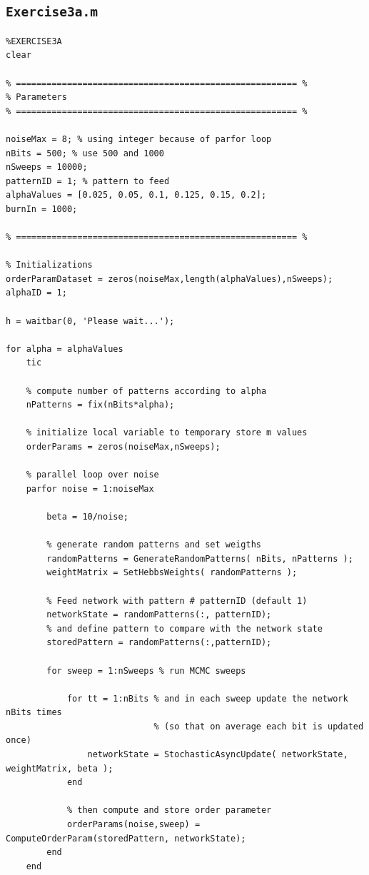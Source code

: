 \documentclass[12pt,A4,titlepage]{article}
\begin{document}
\subsection*{\texttt{Exercise3a.m}}
\begin{lstlisting}
%EXERCISE3A
clear 

% ======================================================= %
% Parameters
% ======================================================= %

noiseMax = 8; % using integer because of parfor loop
nBits = 500; % use 500 and 1000
nSweeps = 10000;
patternID = 1; % pattern to feed
alphaValues = [0.025, 0.05, 0.1, 0.125, 0.15, 0.2];
burnIn = 1000;

% ======================================================= %

% Initializations
orderParamDataset = zeros(noiseMax,length(alphaValues),nSweeps);
alphaID = 1;

h = waitbar(0, 'Please wait...');

for alpha = alphaValues
    tic

    % compute number of patterns according to alpha
    nPatterns = fix(nBits*alpha);

    % initialize local variable to temporary store m values
    orderParams = zeros(noiseMax,nSweeps);

    % parallel loop over noise
    parfor noise = 1:noiseMax

        beta = 10/noise;

        % generate random patterns and set weigths
        randomPatterns = GenerateRandomPatterns( nBits, nPatterns );
        weightMatrix = SetHebbsWeights( randomPatterns );

        % Feed network with pattern # patternID (default 1)
        networkState = randomPatterns(:, patternID);
        % and define pattern to compare with the network state
        storedPattern = randomPatterns(:,patternID); 

        for sweep = 1:nSweeps % run MCMC sweeps

            for tt = 1:nBits % and in each sweep update the network nBits times
                             % (so that on average each bit is updated once)
                networkState = StochasticAsyncUpdate( networkState, weightMatrix, beta );
            end

            % then compute and store order parameter
            orderParams(noise,sweep) = ComputeOrderParam(storedPattern, networkState);
        end
    end


\end{lstlisting}
\end{document}
